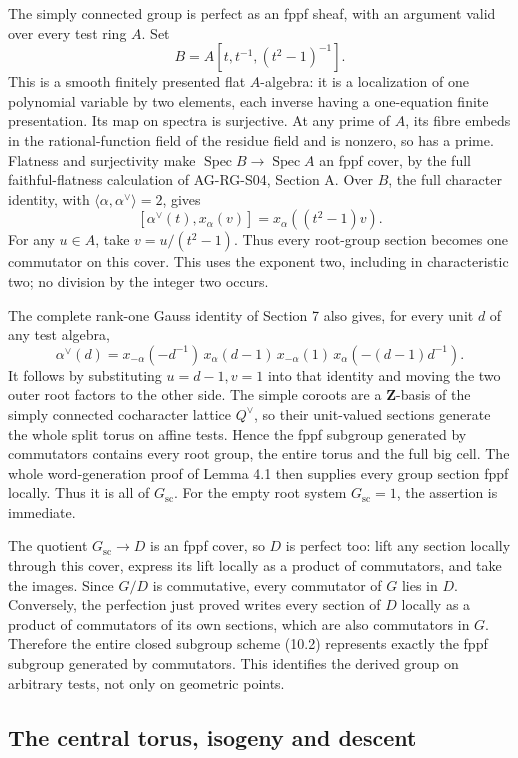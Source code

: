 \documentclass[11pt,a4paper,openany]{report}
\begin{document}
The simply connected group is perfect as an fppf sheaf, with an argument valid over every test ring \(A\). Set \[
 B=A[t,t^{-1},(t^2-1)^{-1}].
\] This is a smooth finitely presented flat \(A\)-algebra: it is a localization of one polynomial variable by two elements, each inverse having a one-equation finite presentation. Its map on spectra is surjective. At any prime of \(A\), its fibre embeds in the rational-function field of the residue field and is nonzero, so has a prime. Flatness and surjectivity make \(\operatorname{Spec}B\to\operatorname{Spec}A\) an fppf cover, by the full faithful-flatness calculation of AG-RG-S04, Section A. Over \(B\), the full character identity, with \(\langle\alpha,\alpha^\vee\rangle=2\), gives \[
 [\alpha^\vee(t),x_\alpha(v)]
       =x_\alpha((t^2-1)v).
\] For any \(u\in A\), take \(v=u/(t^2-1)\). Thus every root-group section becomes one commutator on this cover. This uses the exponent two, including in characteristic two; no division by the integer two occurs.

The complete rank-one Gauss identity of Section 7 also gives, for every unit \(d\) of any test algebra, \[
 \alpha^\vee(d)=
 x_{-\alpha}(-d^{-1})\,x_\alpha(d-1)\,
 x_{-\alpha}(1)\,x_\alpha(-(d-1)d^{-1}).
\] It follows by substituting \(u=d-1,v=1\) into that identity and moving the two outer root factors to the other side. The simple coroots are a \(\mathbf Z\)-basis of the simply connected cocharacter lattice \(Q^\vee\), so their unit-valued sections generate the whole split torus on affine tests. Hence the fppf subgroup generated by commutators contains every root group, the entire torus and the full big cell. The whole word-generation proof of Lemma 4.1 then supplies every group section fppf locally. Thus it is all of \(G_{\mathrm{sc}}\). For the empty root system \(G_{\mathrm{sc}}=1\), the assertion is immediate.

The quotient \(G_{\mathrm{sc}}\to D\) is an fppf cover, so \(D\) is perfect too: lift any section locally through this cover, express its lift locally as a product of commutators, and take the images. Since \(G/D\) is commutative, every commutator of \(G\) lies in \(D\). Conversely, the perfection just proved writes every section of \(D\) locally as a product of commutators of its own sections, which are also commutators in \(G\). Therefore the entire closed subgroup scheme (10.2) represents exactly the fppf subgroup generated by commutators. This identifies the derived group on arbitrary tests, not only on geometric points.

\subsection{The central torus, isogeny and descent}\label{AG-RG-05-the-central-torus-isogeny-and-descent}
\end{document}
